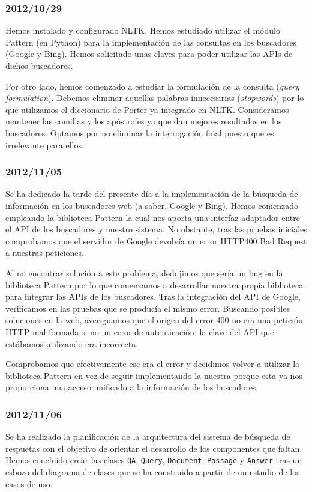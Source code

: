 \documentclass[12pt,a4paper,titlepage]{article}
\begin{document}
\subsubsection*{2012/10/29}
Hemos instalado y configurado NLTK. Hemos estudiado utilizar el módulo Pattern (en Python) para la implementación de las consultas en los buscadores (Google y Bing). Hemos solicitado unas claves para poder utilizar las APIs de dichos buscadores.

Por otro lado, hemos comenzado a estudiar la formulación de la consulta (\emph{query formulation}). Debemos eliminar aquellas palabras innecesarias (\emph{stopwords}) por lo que utilizamos el diccionario de Porter ya integrado en NLTK. Consideramos mantener las comillas y los apóstrofes ya que dan mejores resultados en los buscadores. Optamos por no eliminar la interrogación final puesto que es irrelevante para ellos.

\subsubsection*{2012/11/05}
Se ha dedicado la tarde del presente día a la implementación de la búsqueda de información en los buscadores web (a saber, Google y Bing). Hemos comenzado empleando la biblioteca Pattern\cite{pattern-web} la cual nos aporta una interfaz adaptador entre el API de los buscadores y nuestro sistema. No obstante, tras las pruebas iniciales comprobamos que el servidor de Google devolvía un error HTTP400 Bad Request a nuestras peticiones.

Al no encontrar solución a este problema, dedujimos que sería un bug en la biblioteca Pattern por lo que comenzamos a desarrollar nuestra propia biblioteca para integrar las APIs de los buscadores. Tras la integración del API de Google, verificamos en las pruebas que se producía el mismo error. Buscando posibles soluciones en la web, averiguamos que el origen del error 400 no era una petición HTTP mal formada si no un error de autenticación: la clave del API que estábamos utilizando era incorrecta.

Comprobamos que efectivamente ese era el error y decidimos volver a utilizar la biblioteca Pattern en vez de seguir implementando la nuestra porque esta ya nos proporciona una acceso unificado a la información de los buscadores.

\subsubsection*{2012/11/06}
Se ha realizado la planificación de la arquitectura del sistema de búsqueda de respuetas con el objetivo de orientar el desarrollo de los componentes que faltan. Hemos concluido crear las clases \texttt{QA}, \texttt{Query}, \texttt{Document}, \texttt{Passage} y \texttt{Answer} tras un esbozo del diagrama de clases que se ha construido a partir de un estudio de los casos de uso.
\end{document}
